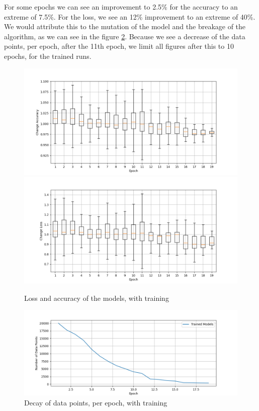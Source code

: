 For some epochs we can see an improvement to 2.5\% for the accuracy to an extreme of 7.5\%.
For the loss, we see an 12\% improvement to an extreme of 40\%.
We would attribute this to the mutation of the model and the breakage of the algorithm, as we can see in the figure \ref{fig:decay_training}.
Because we see a decrease of the data points, per epoch, after the 11th epoch, we limit all figures after this to 10 epochs, for the trained runs.
\begin{figure}
    \centering
    \includegraphics[width=\textwidth]{plots/Trained_Change_Acc.png}
    \includegraphics[width=\textwidth]{plots/Trained_Change_Loss.png}
    \caption{Loss and accuracy of the models, with training}
    \label{fig:loss-accuracy-training}
\end{figure}
\begin{figure}
    \centering
    \includegraphics[width=\textwidth]{plots/Trained_Points_perEpoch.png}
    \caption{Decay of data points, per epoch, with training}
    \label{fig:decay_training}
\end{figure}
